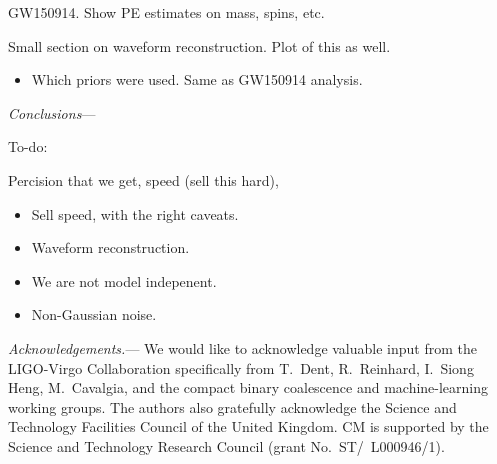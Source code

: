 \documentclass[%
showpacs,
 amsmath,amssymb,
 aps,
 twocolumn,
 prl,
 reprint,
floatfix,
]{revtex4-1}
\begin{document}
GW150914. Show PE estimates on mass, spins, etc.

Small section on waveform reconstruction. Plot of this as well.  

\begin{itemize}
\item Which priors were used. Same as GW150914 analysis.
\end{itemize}
\textit{Conclusions}---

To-do:

Percision that we get, speed (sell this hard), 

\begin{itemize}
\item Sell speed, with the right caveats.
\item Waveform reconstruction.
\item We are not model indepenent.
\item Non-Gaussian noise.
\end{itemize}

%
%
\emph{Acknowledgements.}---
%
We would like to acknowledge valuable input from the LIGO-Virgo Collaboration
specifically from T.~Dent, R.~Reinhard, I.~Siong Heng, M.~Cavalgia, and the compact binary coalescence and
machine-learning working groups. The authors also gratefully acknowledge the
Science and Technology Facilities Council of the United Kingdom. CM is
supported by the Science and Technology Research Council (grant
No.~ST/~L000946/1).
%




\end{document}

